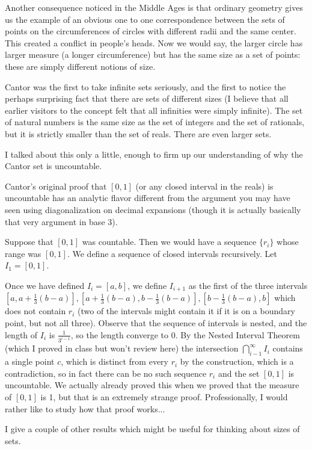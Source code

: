 \documentclass[12pt]{article}
\begin{document}
Another consequence noticed in the Middle Ages is that ordinary geometry gives us the example of an obvious one to one correspondence between the sets of points on the circumferences of circles with different radii and the same center.  This created a conflict in people's heads.  Now we would say, the larger circle has larger measure (a longer circumference) but has the same size as a set of points:  these are simply different notions of size.

Cantor was the first to take infinite sets seriously, and the first to notice the perhaps surprising fact that there are sets of different sizes (I believe that all earlier visitors to the concept felt that all infinities were simply infinite).  The set of natural numbers is the same size as the set of integers and the set of rationals, but it is strictly smaller than the set of reals.   There are even larger sets.

I talked about this only a little, enough to firm up our understanding of why the Cantor set is uncountable.

Cantor's original proof that $[0,1]$ (or any closed interval in the reals) is uncountable has an analytic flavor different from the argument you may have seen using diagonalization on decimal expansions
(though it is actually basically that very argument in base 3).

Suppose that $[0,1]$ was countable.  Then we would have a sequence $\{r_i\}$ whose range was $[0,1]$.  We define a sequence of closed intervals recursively.  Let $I_1=[0,1]$.

Once we have defined $I_i = [a,b]$, we define $I_{i+1}$ as the first of the three intervals $[a,a+\frac13(b-a)],[a+\frac13(b-a),b-\frac13(b-a)],[b-\frac13(b-a),b]$ which does not contain $r_i$ (two of the intervals might contain it if it is on a boundary point, but not all three).  Observe that the sequence of intervals is nested, and the length of $I_i$ is $\frac1{3^{i-1}}$, so the length converge to 0.
By the Nested Interval Theorem (which I proved in class but won't review here) the intersection $\bigcap_{i-1}^\infty I_i$ contains a single point $c$, which is distinct from every $r_i$ by the construction, which is a contradiction, so in fact there can be no such sequence $r_i$ and the set $[0,1]$ is uncountable.  We actually already proved this when we proved that the measure of $[0,1]$ is 1, but that is an extremely strange proof.  Professionally, I would rather like to study how that proof works...

I give a couple of other results which might be useful for thinking about sizes of sets.\
\end{document}
